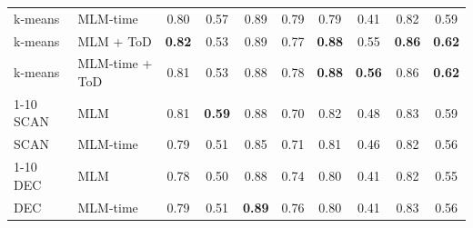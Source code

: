 \begin{table}[t]
\begin{tabular}{llcccccc|cc}
k-means & MLM-time & 0.80 & 0.57 & 0.89 & 0.79 & 0.79 & 0.41 & 0.82 & 0.59 \\
k-means & MLM + ToD & \textbf{0.82} & 0.53 & 0.89 & 0.77 & \textbf{0.88} & 0.55 & \textbf{0.86} & \textbf{0.62} \\
k-means & MLM-time + ToD & 0.81 & 0.53 & 0.88 & 0.78 & \textbf{0.88} & \textbf{0.56} & 0.86 & \textbf{0.62} \\
\cmidrule{1-10}
SCAN & MLM & 0.81 & \textbf{0.59} & 0.88 & 0.70 & 0.82 & 0.48 & 0.83 & 0.59 \\
SCAN & MLM-time & 0.79 & 0.51 & 0.85 & 0.71 & 0.81 & 0.46 & 0.82 & 0.56 \\
\cmidrule{1-10}
DEC & MLM & 0.78 & 0.50 & 0.88 & 0.74 & 0.80 & 0.41 & 0.82 & 0.55 \\
DEC & MLM-time & 0.79 & 0.51 & \textbf{0.89} & 0.76 & 0.80 & 0.41 & 0.83 & 0.56 \\
\bottomrule
\end{tabular}
\end{table}

